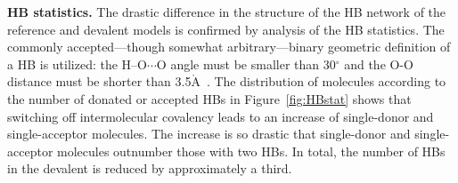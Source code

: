 \documentclass[journal=jacsat,manuscript=article]{achemso}
\newcommand{\Ang}{\ensuremath{\mathring{\text{A}}}}
\begin{document}

 
\textbf{HB statistics.} The drastic difference in the structure of the HB network of the reference and devalent models is confirmed by analysis of the HB statistics. 
The commonly accepted---though somewhat arbitrary---binary geometric definition of a HB is utilized: the H--O$\cdots$O angle must be smaller than 30$^{\circ}$ and the O-O distance must be shorter than 3.5\Ang~\cite{rey2002hydrogen,lawrence2003vibrational}. 
The distribution of molecules according to the number of donated or accepted HBs in Figure~\ref{fig:HBstat} shows that switching off intermolecular covalency leads to an increase of single-donor and single-acceptor molecules. 
The increase is so drastic that single-donor and single-acceptor molecules outnumber those with two HBs.
In total, the number of HBs in the devalent is reduced by approximately a third.
\end{document}
